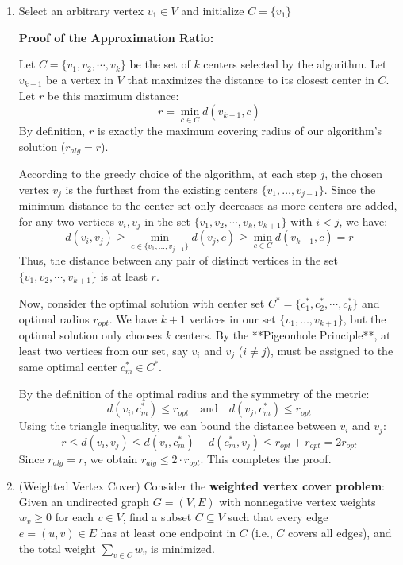 \documentclass[12pt,a4paper]{article}
\makeatletter
\newtheorem*{solution}{Solution}
\theoremstyle{definition}
\renewenvironment{solution}[1][Solution] {\par\pushQED{\qed}\normalfont\topsep6\p@\@plus6\p@\relax\trivlist\item[\hskip\labelsep\bfseries#1\@addpunct{.}]\ignorespaces}{\popQED\endtrivlist\@endpefalse} \makeatother
\makeatother
\begin{document}
\begin{enumerate}
\begin{solution}
\begin{algorithm}[H]
  Select an arbitrary vertex $v_1 \in V$ and initialize $C = \{v_1\}$\;
  
  
  \;
  \end{algorithm}

  \textbf{Proof of the Approximation Ratio:}

  Let $C = \{v_1, v_2, \cdots, v_k\}$ be the set of $k$ centers selected by the algorithm. Let $v_{k+1}$ be a vertex in $V$ that maximizes the distance to its closest center in $C$. Let $r$ be this maximum distance:
  \[
  r = \min_{c \in C} d(v_{k+1}, c)
  \]
  By definition, $r$ is exactly the maximum covering radius of our algorithm's solution ($r_{alg} = r$).

  According to the greedy choice of the algorithm, at each step $j$, the chosen vertex $v_j$ is the furthest from the existing centers $\{v_1, \dots, v_{j-1}\}$. Since the minimum distance to the center set only decreases as more centers are added, for any two vertices $v_i, v_j$ in the set $\{v_1, v_2, \cdots, v_k, v_{k+1}\}$ with $i < j$, we have:
  \[
  d(v_i, v_j) \ge \min_{c \in \{v_1, \dots, v_{j-1}\}} d(v_j, c) \ge \min_{c \in C} d(v_{k+1}, c) = r
  \]
  Thus, the distance between any pair of distinct vertices in the set $\{v_1, v_2, \cdots, v_{k+1}\}$ is at least $r$.

  Now, consider the optimal solution with center set $C^* = \{c_1^*, c_2^*, \cdots, c_k^*\}$ and optimal radius $r_{opt}$. We have $k+1$ vertices in our set $\{v_1, \dots, v_{k+1}\}$, but the optimal solution only chooses $k$ centers. By the **Pigeonhole Principle**, at least two vertices from our set, say $v_i$ and $v_j$ ($i \neq j$), must be assigned to the same optimal center $c_m^* \in C^*$.

  By the definition of the optimal radius and the symmetry of the metric:
  \[
  d(v_i, c_m^*) \le r_{opt} \quad \text{and} \quad d(v_j, c_m^*) \le r_{opt}
  \]
  Using the triangle inequality, we can bound the distance between $v_i$ and $v_j$:
  \[
  r \le d(v_i, v_j) \le d(v_i, c_m^*) + d(c_m^*, v_j) \le r_{opt} + r_{opt} = 2r_{opt}
  \]
  Since $r_{alg} = r$, we obtain $r_{alg} \le 2 \cdot r_{opt}$. This completes the proof.
  \end{solution}

  \item {\color{purple}(Weighted Vertex Cover)} Consider the \textbf{weighted vertex cover problem}: Given an undirected graph $G=(V,E)$ with nonnegative vertex weights $w_v \ge 0$ for each $v \in V$, find a subset $C \subseteq V$ such that every edge $e=(u,v)\in E$ has at least one endpoint in $C$ (i.e., $C$ covers all edges), and the total weight $\sum_{v\in C} w_v$ is minimized.


\end{enumerate}
\end{document}

